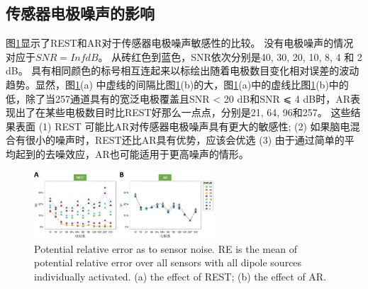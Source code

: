 \subsection{传感器电极噪声的影响}
图\ref{2.8}显示了REST和AR对于传感器电极噪声敏感性的比较。 没有电极噪声的情况对应于$SNR=Inf dB$。 从砖红色到蓝色，SNR依次分别是40, 30, 20, 10, 8, 4 和 2 dB。 具有相同颜色的标号相互连起来以标绘出随着电极数目变化相对误差的波动趋势。显然，图\ref{2.8}(a) 中虚线的间隔比图\ref{2.8}(b)的大，图\ref{2.8}(a)中的虚线比图\ref{2.8}(b)中的低，除了当257通道具有的宽泛电极覆盖且SNR < 20 dB和SNR ⩽ 4 dB时，AR表现出了在某些电极数目时比REST好那么一点点，分别是21, 64, 96和257。 这些结果表面 (1) REST
可能比AR对传感器电极噪声具有更大的敏感性; (2) 如果脑电混合有很小的噪声时，REST还比AR具有优势，应该会优选 (3) 由于通过简单的平均起到的去噪效应，AR也可能适用于更高噪声的情形。
\begin{figure}[h!]
	\centering
	\includegraphics[width=0.6\textwidth,natwidth=610,natheight=642]{pic/JNE/figure8.png}
	\caption{Potential relative error as to sensor noise. RE is the mean of potential relative error over all sensors with all dipole sources individually activated. (a) the effect of REST; (b) the effect of AR.}
	\label{2.8}
\end{figure}

